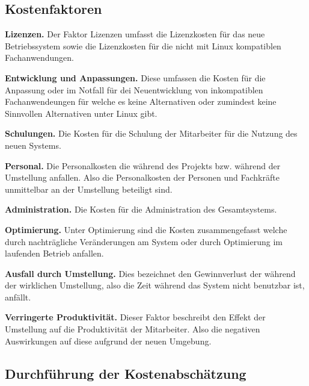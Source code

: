 \documentclass[12pt,utf8]{scrartcl}
\begin{document}
\subsection*{Kostenfaktoren}

\textbf{Lizenzen.} Der Faktor Lizenzen umfasst die Lizenzkosten für das neue Betriebssystem sowie die Lizenzkosten für die nicht mit Linux kompatiblen Fachanwendungen.
\newline

\textbf{Entwicklung und Anpassungen.} Diese umfassen die Kosten für die Anpassung oder im Notfall für dei Neuentwicklung von inkompatiblen Fachanwendeungen für welche es keine Alternativen oder zumindest keine Sinnvollen Alternativen unter Linux gibt.
\newline

\textbf{Schulungen.} Die Kosten für die Schulung der Mitarbeiter für die Nutzung des neuen Systems.
\newline

\textbf{Personal.} Die Personalkosten die während des Projekts bzw. während der Umstellung anfallen. Also die Personalkosten der Personen und Fachkräfte unmittelbar an der Umstellung beteiligt sind.
\newline

\textbf{Administration.} Die Kosten für die Administration des Gesamtsystems.
\newline

\textbf{Optimierung.} Unter Optimierung sind die Kosten zusammengefasst welche durch nachträgliche Veränderungen am System oder durch Optimierung im laufenden Betrieb anfallen.
\newline

\textbf{Ausfall durch Umstellung.} Dies bezeichnet den Gewinnverlust der während der wirklichen Umstellung, also die Zeit während das System nicht benutzbar ist, anfällt.
\newline

\textbf{Verringerte Produktivität.} Dieser Faktor beschreibt den Effekt der Umstellung auf die Produktivität der Mitarbeiter. Also die negativen Auswirkungen auf diese aufgrund der neuen Umgebung.
\newpage

\subsection*{Durchführung der Kostenabschätzung}
\end{document}
